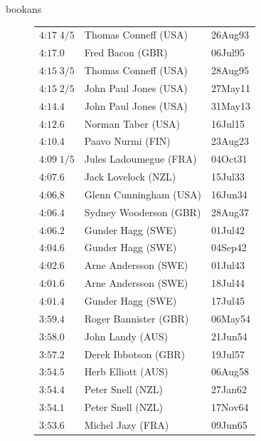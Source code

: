 \begin{exercises}
\begin{Filesave}{bookans}
\begin{figure}
{{\begin{tabular}[t]{|l|ll|}
           $\text{4:17}\;4/5$   &Thomas Conneff (USA)       &26Aug93 \\
           $\text{4:17}.0$      &Fred Bacon (GBR)           &06Jul95 \\
           $\text{4:15}\;3/5$   &Thomas Conneff (USA)       &28Aug95 \\
           $\text{4:15}\;2/5$   &John Paul Jones (USA)      &27May11 \\
           $\text{4:14}.4$      &John Paul Jones (USA)      &31May13 \\
           $\text{4:12}.6$      &Norman Taber (USA)         &16Jul15 \\
           $\text{4:10}.4$      &Paavo Nurmi (FIN)          &23Aug23 \\
           $\text{4:09}\;1/5$   &Jules Ladoumegue (FRA)     &04Oct31 \\
           $\text{4:07}.6$      &Jack Lovelock (NZL)        &15Jul33 \\
           $\text{4:06}.8$      &Glenn Cunningham (USA)     &16Jun34 \\
           $\text{4:06}.4$      &Sydney Wooderson (GBR)     &28Aug37 \\
           $\text{4:06}.2$      &Gunder Hagg (SWE)          &01Jul42 \\
           $\text{4:04}.6$      &Gunder Hagg (SWE)          &04Sep42 \\
           $\text{4:02}.6$      &Arne Andersson (SWE)       &01Jul43 \\
           $\text{4:01}.6$      &Arne Andersson (SWE)       &18Jul44 \\
           $\text{4:01}.4$      &Gunder Hagg (SWE)          &17Jul45 \\
           $\text{3:59}.4$      &Roger Bannister (GBR)      &06May54 \\
           $\text{3:58}.0$      &John Landy (AUS)           &21Jun54 \\
           $\text{3:57}.2$      &Derek Ibbotson (GBR)       &19Jul57 \\
           $\text{3:54}.5$      &Herb Elliott (AUS)         &06Aug58 \\
           $\text{3:54}.4$      &Peter Snell (NZL)          &27Jan62 \\ 
           $\text{3:54}.1$      &Peter Snell (NZL)          &17Nov64 \\
           $\text{3:53}.6$      &Michel Jazy (FRA)          &09Jun65 \\

\end{tabular}}}
\end{figure}
\end{Filesave}
\end{exercises}
